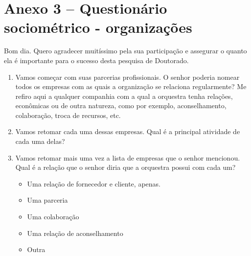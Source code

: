 \documentclass[a4paper, 12pt, openright, oneside, german, french, english, brazil]{abntex2}
\begin{document}
	
	\newpage
	
	
	
	\chapter*[Questionário - organizações]{Anexo 3 -- Questionário sociométrico - organizações}
	
	
	Bom dia. Quero agradecer muitíssimo pela sua participação e assegurar o quanto ela é importante para o sucesso desta pesquisa de Doutorado.
	
	\vspace{1cm}
	\begin{enumerate}
		
		\item Vamos começar com suas parcerias profissionais. O senhor poderia nomear todos os empresas com as quais a organização se relaciona regularmente? Me refiro aqui a qualquer companhia com a qual a orquestra tenha relações, econômicas ou de outra natureza, como por exemplo, aconselhamento, colaboração, troca de recursos, etc.
		
		
		\item Vamos retomar cada uma dessas empresas. Qual é a principal atividade de cada uma delas?
		
		
		\item Vamos retomar mais uma vez a lista de empresas que o senhor mencionou. Qual é a relação que o senhor diria que a orquestra possui com cada um?
		\begin{itemize}
			\item Uma relação de fornecedor e cliente, apenas.
			\item Uma parceria
			\item Uma colaboração
			\item Uma relação de aconselhamento
			\item Outra
		\end{itemize}
		

\end{enumerate}
\end{document}
